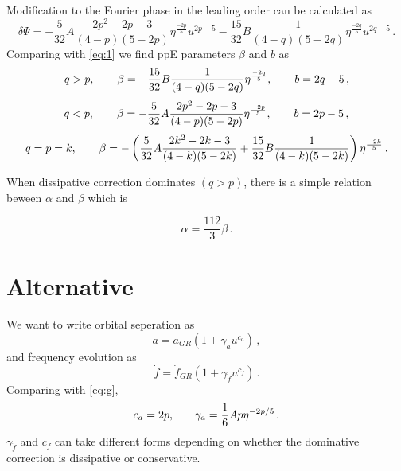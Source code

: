 \documentclass[11pt]{article}
\begin{document}
 \hspace*{15.5pt}Modification to the Fourier phase in the leading order can be calculated as \cite{Chatziioannou:2012rf}
 \begin{equation}
 \delta\Psi=-\frac{5}{32}A\frac{2p^2-2p-3}{(4-p)(5-2p)}\eta^{\frac{-2p}{5}}u^{2p-5}-\frac{15}{32}B\frac{1}{(4-q)(5-2q)}\eta^{\frac{-2q}{5}}u^{2q-5}\,.
 \end{equation}
 Comparing with \eqref{eq:1} we find ppE parameters $\beta$ and $b$ as
 \begin{equation}
 q>p,\hspace*{20pt}\beta=-\frac{15}{32}B\frac{1}{(4-q)(5-2q)}\eta^{\frac{-2q}{5}},\hspace*{20pt} b=2q-5\,,
 \end{equation}
 \begin{equation}
 q<p,\hspace*{20pt}\beta=-\frac{5}{32}A\frac{2p^2-2p-3}{(4-p)(5-2p)}\eta^{\frac{-2p}{5}},\hspace*{20pt}b=2p-5\,,
 \end{equation}
 \begin{equation}\label{eq:2b}
 q=p=k,\hspace*{20pt}\beta=-\left(\frac{5}{32}A\frac{2k^2-2k-3}{(4-k)(5-2k)}+\frac{15}{32}B\frac{1}{(4-k)(5-2k)}\right)\eta^{\frac{-2k}{5}}\,.
 \end{equation}
 
 When dissipative correction dominates $(q>p)$, there is a simple relation beween $\alpha$ and $\beta$ which is
 
\begin{equation}\label{eq:2c}
\alpha=\frac{112}{3}\beta\,.
\end{equation} 
 
 
 \section*{Alternative}
 \hspace*{15.5pt}We want to write orbital seperation as
 \begin{equation}
 a=a_{GR}(1+\gamma_au^{c_a})\,,
 \end{equation}
and frequency evolution as
\begin{equation}
\dot{f}=\dot{f}_{GR}\left(1+\gamma_{\dot{f}}u^{c_{\dot{f}}}\right)\,.
\end{equation} 
Comparing with \eqref{eq:g},
\begin{equation}
c_{a}=2p \text{,\hspace{20pt}}\gamma_a=\frac{1}{6}Ap\eta^{-2p/5}\,.
\end{equation}
$\gamma_{\dot{f}}$ and $c_{\dot{f}}$ can take different forms depending on whether the dominative correction is dissipative or conservative.
\end{document}
